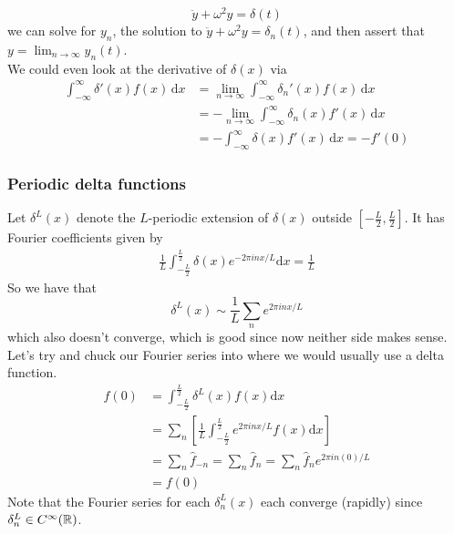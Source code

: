 \documentclass{article}
\begin{document}
\[
  \ddot y + \omega^2y=\delta(t)
\]
we can solve for $ y_n $, the solution to
$ \ddot y+\omega^2y=\delta_n(t) $, and then assert that $ y=\lim_{n\to\infty}y_n(t) $.\\
We could even look at the derivative of $ \delta(x) $ via
\begin{align*}
	\int_{-\infty}^\infty\delta'(x)f(x)\,\mathrm dx &= \lim_{n\to\infty}\int_{-\infty}^\infty \delta_n'(x)f(x)\,\mathrm dx\\
																											 &= -\lim_{n\to\infty}\int_{-\infty}^\infty \delta_n(x)f'(x)\,\mathrm dx\\
																											 &= -\int_{-\infty}^\infty \delta(x)f'(x)\,\mathrm dx = -f'(0)
\end{align*}
\subsubsection{Periodic delta functions}
Let $ \delta^L(x) $ denote the $ L $-periodic extension of $ \delta(x) $ outside $ [-\frac L2, \frac L2] $. It has Fourier coefficients given by
\begin{align*}
	\frac 1L\int_{-\frac L2}^{\frac L2}\delta(x)e^{-2\pi inx/L}\mathrm dx=\frac 1L
\end{align*}
So we have that
\[
	\delta^L(x)\sim \frac 1L\sum_n e^{2\pi inx/L}
\]
which also doesn't converge, which is good since now neither side makes sense. Let's try and chuck our Fourier series into where we would usually use a delta function.
\begin{align*}
	f(0)&=\int_{-\frac L2}^{\frac L2}\delta^L(x)f(x)\mathrm dx\\
	    &=\sum_n\left[\frac 1L\int_{-\frac L2}^{\frac L2}e^{2\pi in x/L}f(x)\mathrm dx\right]\\
	    &=\sum_n\hat f_{-n}=\sum_n\hat f_n=\sum_n \hat f_ne^{2\pi i n(0)/L}\\
	    &=f(0)
\end{align*}
Note that the Fourier series for each $ \delta_n^L(x) $ each converge (rapidly) since $ \delta_n^L\in C^\infty(\mathbb{R}) $.
\end{document}
